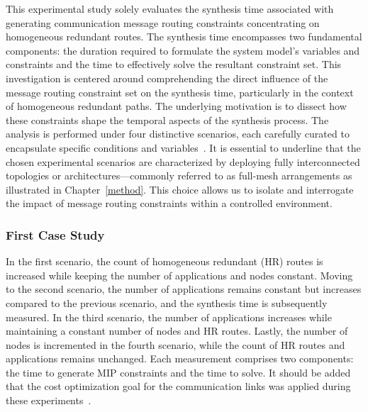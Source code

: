     This experimental study solely evaluates the synthesis time associated with generating communication message routing constraints concentrating on homogeneous redundant routes. The synthesis time encompasses two fundamental components: the duration required to formulate the system model's variables and constraints and the time to effectively solve the resultant constraint set.
    This investigation is centered around comprehending the direct influence of the message routing constraint set on the synthesis time, particularly in the context of homogeneous redundant paths. The underlying motivation is to dissect how these constraints shape the temporal aspects of the synthesis process. The analysis is performed under four distinctive scenarios, each carefully curated to encapsulate specific conditions and variables~\cite{9565115}.
    It is essential to underline that the chosen experimental scenarios are characterized by deploying fully interconnected topologies or architectures—commonly referred to as full-mesh arrangements as illustrated in Chapter~\ref{method}. This choice allows us to isolate and interrogate the impact of message routing constraints within a controlled environment.
    
    
    
    \subsubsection{First Case Study}
    In the first scenario, the count of homogeneous redundant (HR) routes is increased while keeping the number of applications and nodes constant. Moving to the second scenario, the number of applications remains constant but increases compared to the previous scenario, and the synthesis time is subsequently measured. In the third scenario, the number of applications increases while maintaining a constant number of nodes and HR routes. Lastly, the number of nodes is incremented in the fourth scenario, while the count of HR routes and applications remains unchanged. Each measurement comprises two components: the time to generate MIP constraints and the time to solve. It should be added that the cost optimization goal for the communication links was applied during these experiments~\cite{9565115, 9212001}.





